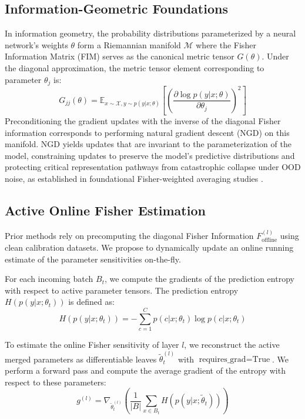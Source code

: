 \documentclass{article}
\theoremstyle{plain}
\theoremstyle{definition}
\begin{document}
\subsection{Information-Geometric Foundations}
In information geometry, the probability distributions parameterized by a neural network's weights $\theta$ form a Riemannian manifold $\mathcal{M}$ where the Fisher Information Matrix (FIM) serves as the canonical metric tensor $G(\theta)$. Under the diagonal approximation, the metric tensor element corresponding to parameter $\theta_j$ is:
\begin{equation}
    G_{jj}(\theta) = \mathbb{E}_{x \sim \mathcal{X}, y \sim p(y|x; \theta)} \left[ \left( \frac{\partial \log p(y|x; \theta)}{\partial \theta_j} \right)^2 \right]
\end{equation}
Preconditioning the gradient updates with the inverse of the diagonal Fisher information corresponds to performing natural gradient descent (NGD) on this manifold. NGD yields updates that are invariant to the parameterization of the model, constraining updates to preserve the model's predictive distributions and protecting critical representation pathways from catastrophic collapse under OOD noise, as established in foundational Fisher-weighted averaging studies \cite{matena2021_91}.

\subsection{Active Online Fisher Estimation}
Prior methods rely on precomputing the diagonal Fisher Information $F_{\text{offline}}^{(l)}$ using clean calibration datasets. We propose to dynamically update an online running estimate of the parameter sensitivities on-the-fly. 

For each incoming batch $B_t$, we compute the gradients of the prediction entropy with respect to active parameter tensors. The prediction entropy $H(p(y|x; \theta_t))$ is defined as:
\begin{equation}
    H(p(y|x; \theta_t)) = - \sum_{c=1}^C p(c|x; \theta_t) \log p(c|x; \theta_t)
\end{equation}

To estimate the online Fisher sensitivity of layer $l$, we reconstruct the active merged parameters as differentiable leaves $\tilde{\theta}_t^{(l)}$ with $\text{requires\_grad}=\text{True}$. We perform a forward pass and compute the average gradient of the entropy with respect to these parameters:
\begin{equation}
    g^{(l)} = \nabla_{\tilde{\theta}_t^{(l)}} \left( \frac{1}{|B|} \sum_{x \in B_t} H(p(y|x; \tilde{\theta}_t)) \right)
\end{equation}
\end{document}
